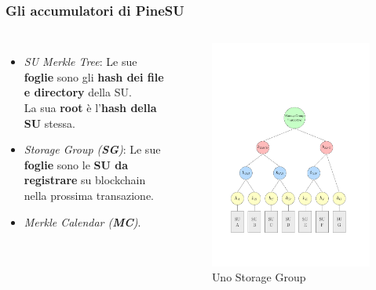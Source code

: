 \documentclass{beamer}
\begin{document}
\begin{frame}
	\frametitle{Gli accumulatori di PineSU}
	\begin{columns}
		\begin{itemize}%
			\item \emph{SU Merkle Tree}: Le sue \textbf{foglie} sono gli \textbf{hash dei file e directory} della SU.\\La sua \textbf{root} è l'\textbf{hash della SU} stessa. 
			\item \emph{Storage Group (\textbf{SG})}: Le sue \textbf{foglie} sono le \textbf{SU da registrare} su blockchain nella prossima transazione.
			\item \emph{Merkle Calendar (\textbf{MC})}.
		\end{itemize}
		\centering
		\begin{figure}
			\includegraphics[width=\textwidth]{figures/sg1.pdf}
			\caption{Uno Storage Group}
		\end{figure} 
	\end{columns}
\end{frame}
\end{document}
